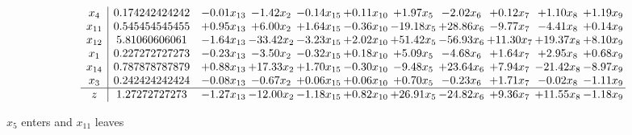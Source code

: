 \documentclass[9pt]{article}
\begin{document}
 \[\begin{array}{c| c c@{\hskip 2pt} c@{\hskip 2pt} c@{\hskip 2pt} c@{\hskip 2pt} c@{\hskip 2pt} c@{\hskip 2pt} c@{\hskip 2pt} c@{\hskip 2pt} c@{\hskip 2pt} }
 x_{4}   &  0.174242424242 & -0.01 x_{13} & -1.42 x_{2} & -0.14 x_{15} & +  0.11 x_{10} & +  1.97 x_{5} & -2.02 x_{6} & +  0.12 x_{7} & +  1.10 x_{8} & +  1.19 x_{9}\\
 x_{11}   &  0.545454545455 & +  0.95 x_{13} & +  6.00 x_{2} & +  1.64 x_{15} & -0.36 x_{10} & -19.18 x_{5} & + 28.86 x_{6} & -9.77 x_{7} & -4.41 x_{8} & +  0.14 x_{9}\\
 x_{12}   &  5.81060606061 & -1.64 x_{13} & -33.42 x_{2} & -3.23 x_{15} & +  2.02 x_{10} & + 51.42 x_{5} & -56.93 x_{6} & + 11.30 x_{7} & + 19.37 x_{8} & +  8.10 x_{9}\\
 x_{1}   &  0.227272727273 & -0.23 x_{13} & -3.50 x_{2} & -0.32 x_{15} & +  0.18 x_{10} & +  5.09 x_{5} & -4.68 x_{6} & +  1.64 x_{7} & +  2.95 x_{8} & +  0.68 x_{9}\\
 x_{14}   &  0.787878787879 & +  0.88 x_{13} & + 17.33 x_{2} & +  1.70 x_{15} & -0.30 x_{10} & -9.48 x_{5} & + 23.64 x_{6} & +  7.94 x_{7} & -21.42 x_{8} & -8.97 x_{9}\\
 x_{3}   &  0.242424242424 & -0.08 x_{13} & -0.67 x_{2} & +  0.06 x_{15} & +  0.06 x_{10} & +  0.70 x_{5} & -0.23 x_{6} & +  1.71 x_{7} & -0.02 x_{8} & -1.11 x_{9}\\
\hline
z    &  1.27272727273 & -1.27 x_{13} & -12.00 x_{2} & -1.18 x_{15} & +  0.82 x_{10} & + 26.91 x_{5} & -24.82 x_{6} & +  9.36 x_{7} & + 11.55 x_{8} & -1.18 x_{9}\\
\end{array}\]


 $ x_{5} $ enters and $ x_{11} $ leaves 
\end{document}
